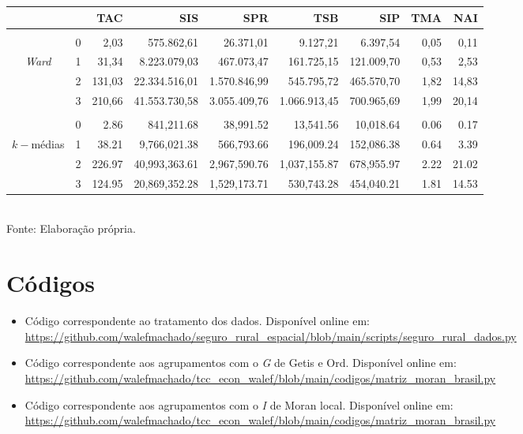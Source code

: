 \documentclass[
	12pt,				%
	openright,			%
	oneside,			%
	a4paper,			%
	chapter=TITLE,		%
	section=TITLE,		%
	english,			%
	french,				%
	spanish,			%
	brazil				%
	]{abntex2}
\begin{document}
\begin{apendicesenv}
\begin{table}
\begin{tabular}{ccrrrrrrr}
                      &   & TAC   & SIS   & SPR   & TSB   & SIP  & TMA   & NAI   \\
        \hline \\[-1.9ex]	 
                            & 0 &   2,03 &    575.862,61 &    26.371,01 &     9.127,21 &   6.397,54 & 0,05 & 0,11 \\
        \textit{Ward}       & 1 &  31,34 &  8.223.079,03 &   467.073,47 &   161.725,15 & 121.009,70 & 0,53 & 2,53 \\
                            & 2 & 131,03 & 22.334.516,01 & 1.570.846,99 &   545.795,72 & 465.570,70 & 1,82 &14,83 \\
                            & 3 & 210,66 & 41.553.730,58 & 3.055.409,76 & 1.066.913,45 & 700.965,69 & 1,99 &20,14 \\
        \hline \\[-1.9ex]	 
                            & 0 &   2.86 &    841,211.68 &    38,991.52 &    13,541.56 &  10,018.64 & 0.06 & 0.17 \\
        $k-$médias          & 1 &  38.21 &  9,766,021.38 &   566,793.66 &   196,009.24 & 152,086.38 & 0.64 & 3.39 \\
                            & 2 & 226.97 & 40,993,363.61 & 2,967,590.76 & 1,037,155.87 & 678,955.97 & 2.22 &21.02 \\
                            & 3 & 124.95 & 20,869,352.28 & 1,529,173.71 &   530,743.28 & 454,040.21 & 1.81 &14.53 \\
        \hline 
    \end{tabular} \\
    \footnotesize{Fonte: Elaboração própria.  }
\end{table}

\newpage
\chapter{\textbf{Códigos}}\label{codigos}      %

\begin{itemize}
    \item Código correspondente ao tratamento dos dados. Disponível online em: \url{https://github.com/walefmachado/seguro_rural_espacial/blob/main/scripts/seguro_rural_dados.py}
    
    \item Código correspondente aos agrupamentos com o \textit{G} de Getis e Ord. Disponível online em: \url{https://github.com/walefmachado/tcc_econ_walef/blob/main/codigos/matriz_moran_brasil.py}
    
    \item Código correspondente aos agrupamentos com o \textit{I} de Moran local. Disponível online em: \url{https://github.com/walefmachado/tcc_econ_walef/blob/main/codigos/matriz_moran_brasil.py}
\end{itemize}

\vspace{0.25cm}

% 
%

\end{apendicesenv}
\end{document}
